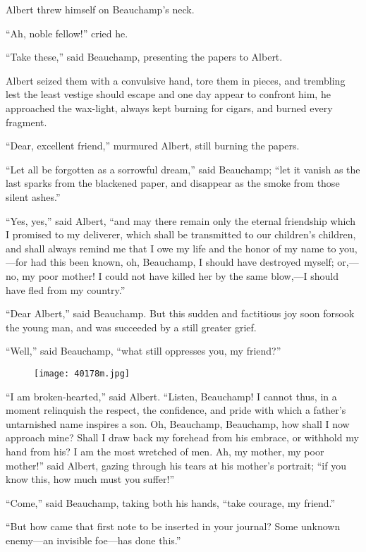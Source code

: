 Albert threw himself on Beauchamp’s neck.

“Ah, noble fellow!” cried he.

“Take these,” said Beauchamp, presenting the papers to Albert.

Albert seized them with a convulsive hand, tore them in pieces, and
trembling lest the least vestige should escape and one day appear to
confront him, he approached the wax-light, always kept burning for
cigars, and burned every fragment.

“Dear, excellent friend,” murmured Albert, still burning the papers.

“Let all be forgotten as a sorrowful dream,” said Beauchamp; “let it
vanish as the last sparks from the blackened paper, and disappear as
the smoke from those silent ashes.”

“Yes, yes,” said Albert, “and may there remain only the eternal
friendship which I promised to my deliverer, which shall be transmitted
to our children’s children, and shall always remind me that I owe my
life and the honor of my name to you,—for had this been known, oh,
Beauchamp, I should have destroyed myself; or,—no, my poor mother! I
could not have killed her by the same blow,—I should have fled from my
country.”

“Dear Albert,” said Beauchamp. But this sudden and factitious joy soon
forsook the young man, and was succeeded by a still greater grief.

“Well,” said Beauchamp, “what still oppresses you, my friend?”

\begin{figure}[ht]
\texttt{[image: 40178m.jpg]}
\end{figure}

“I am broken-hearted,” said Albert. “Listen, Beauchamp! I cannot thus,
in a moment relinquish the respect, the confidence, and pride with
which a father’s untarnished name inspires a son. Oh, Beauchamp,
Beauchamp, how shall I now approach mine? Shall I draw back my forehead
from his embrace, or withhold my hand from his? I am the most wretched
of men. Ah, my mother, my poor mother!” said Albert, gazing through his
tears at his mother’s portrait; “if you know this, how much must you
suffer!”

“Come,” said Beauchamp, taking both his hands, “take courage, my
friend.”

“But how came that first note to be inserted in your journal? Some
unknown enemy—an invisible foe—has done this.”

